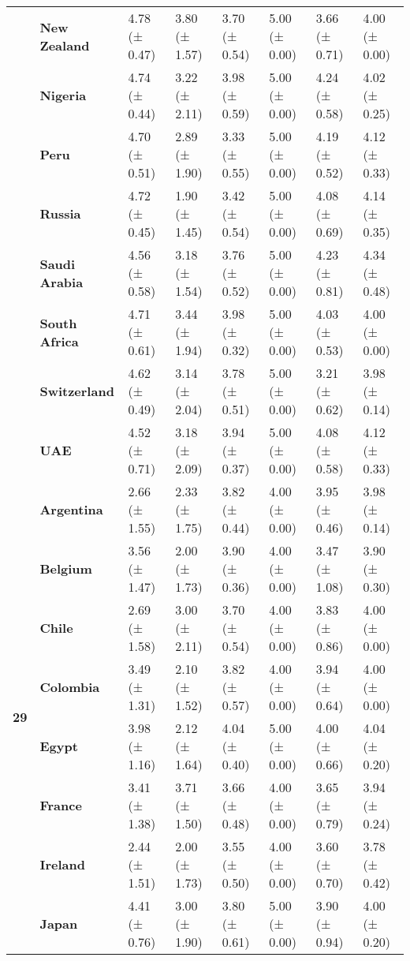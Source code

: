 \begin{longtable}{llllllll}
\textbf{} & \textbf{New Zealand} & 4.78 (± 0.47) & 3.80 (± 1.57) & 3.70 (± 0.54) & 5.00 (± 0.00) & 3.66 (± 0.71) & 4.00 (± 0.00) \\
\textbf{} & \textbf{Nigeria} & 4.74 (± 0.44) & 3.22 (± 2.11) & 3.98 (± 0.59) & 5.00 (± 0.00) & 4.24 (± 0.58) & 4.02 (± 0.25) \\
\textbf{} & \textbf{Peru} & 4.70 (± 0.51) & 2.89 (± 1.90) & 3.33 (± 0.55) & 5.00 (± 0.00) & 4.19 (± 0.52) & 4.12 (± 0.33) \\
\textbf{} & \textbf{Russia} & 4.72 (± 0.45) & 1.90 (± 1.45) & 3.42 (± 0.54) & 5.00 (± 0.00) & 4.08 (± 0.69) & 4.14 (± 0.35) \\
\textbf{} & \textbf{Saudi Arabia} & 4.56 (± 0.58) & 3.18 (± 1.54) & 3.76 (± 0.52) & 5.00 (± 0.00) & 4.23 (± 0.81) & 4.34 (± 0.48) \\
\textbf{} & \textbf{South Africa} & 4.71 (± 0.61) & 3.44 (± 1.94) & 3.98 (± 0.32) & 5.00 (± 0.00) & 4.03 (± 0.53) & 4.00 (± 0.00) \\
\textbf{} & \textbf{Switzerland} & 4.62 (± 0.49) & 3.14 (± 2.04) & 3.78 (± 0.51) & 5.00 (± 0.00) & 3.21 (± 0.62) & 3.98 (± 0.14) \\
\textbf{} & \textbf{UAE} & 4.52 (± 0.71) & 3.18 (± 2.09) & 3.94 (± 0.37) & 5.00 (± 0.00) & 4.08 (± 0.58) & 4.12 (± 0.33) \\
\cline{1-8}
\multirow[t]{19}{*}{\textbf{29}} & \textbf{Argentina} & 2.66 (± 1.55) & 2.33 (± 1.75) & 3.82 (± 0.44) & 4.00 (± 0.00) & 3.95 (± 0.46) & 3.98 (± 0.14) \\
\textbf{} & \textbf{Belgium} & 3.56 (± 1.47) & 2.00 (± 1.73) & 3.90 (± 0.36) & 4.00 (± 0.00) & 3.47 (± 1.08) & 3.90 (± 0.30) \\
\textbf{} & \textbf{Chile} & 2.69 (± 1.58) & 3.00 (± 2.11) & 3.70 (± 0.54) & 4.00 (± 0.00) & 3.83 (± 0.86) & 4.00 (± 0.00) \\
\textbf{} & \textbf{Colombia} & 3.49 (± 1.31) & 2.10 (± 1.52) & 3.82 (± 0.57) & 4.00 (± 0.00) & 3.94 (± 0.64) & 4.00 (± 0.00) \\
\textbf{} & \textbf{Egypt} & 3.98 (± 1.16) & 2.12 (± 1.64) & 4.04 (± 0.40) & 5.00 (± 0.00) & 4.00 (± 0.66) & 4.04 (± 0.20) \\
\textbf{} & \textbf{France} & 3.41 (± 1.38) & 3.71 (± 1.50) & 3.66 (± 0.48) & 4.00 (± 0.00) & 3.65 (± 0.79) & 3.94 (± 0.24) \\
\textbf{} & \textbf{Ireland} & 2.44 (± 1.51) & 2.00 (± 1.73) & 3.55 (± 0.50) & 4.00 (± 0.00) & 3.60 (± 0.70) & 3.78 (± 0.42) \\
\textbf{} & \textbf{Japan} & 4.41 (± 0.76) & 3.00 (± 1.90) & 3.80 (± 0.61) & 5.00 (± 0.00) & 3.90 (± 0.94) & 4.00 (± 0.20) \\

\end{longtable}
